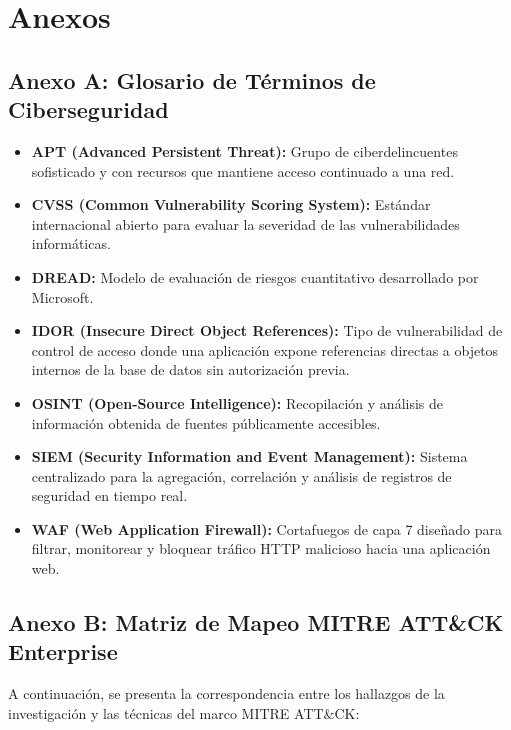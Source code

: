 \chapter*{Anexos}

\section*{Anexo A: Glosario de Términos de Ciberseguridad}
\begin{itemize}
    \item \textbf{APT (Advanced Persistent Threat):} Grupo de ciberdelincuentes sofisticado y con recursos que mantiene acceso continuado a una red.
    \item \textbf{CVSS (Common Vulnerability Scoring System):} Estándar internacional abierto para evaluar la severidad de las vulnerabilidades informáticas.
    \item \textbf{DREAD:} Modelo de evaluación de riesgos cuantitativo desarrollado por Microsoft.
    \item \textbf{IDOR (Insecure Direct Object References):} Tipo de vulnerabilidad de control de acceso donde una aplicación expone referencias directas a objetos internos de la base de datos sin autorización previa.
    \item \textbf{OSINT (Open-Source Intelligence):} Recopilación y análisis de información obtenida de fuentes públicamente accesibles.
    \item \textbf{SIEM (Security Information and Event Management):} Sistema centralizado para la agregación, correlación y análisis de registros de seguridad en tiempo real.
    \item \textbf{WAF (Web Application Firewall):} Cortafuegos de capa 7 diseñado para filtrar, monitorear y bloquear tráfico HTTP malicioso hacia una aplicación web.
\end{itemize}

\section*{Anexo B: Matriz de Mapeo MITRE ATT\&CK Enterprise}
A continuación, se presenta la correspondencia entre los hallazgos de la investigación y las técnicas del marco MITRE ATT\&CK:

